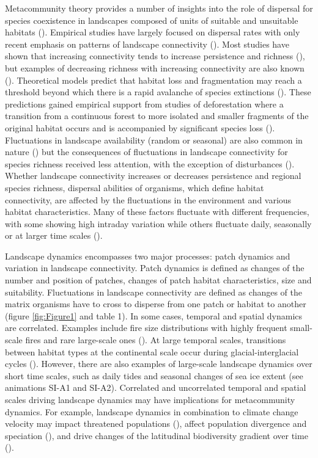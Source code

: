 \documentclass[12pt]{article}
\begin{document}
    Metacommunity theory provides a number of insights into the role of dispersal for species coexistence in landscapes composed of units of suitable and unsuitable habitats (\cite{Holyoaketal2005}). Empirical studies have largely focused on dispersal rates with only recent emphasis on patterns of landscape connectivity (\cite{kneitel2004, cadotte2006}). Most studies have shown that increasing connectivity tends to increase persistence and richness (\cite{ellneretal2001, foxetal2011}), but examples of decreasing richness with increasing connectivity are also known (\cite{daviesetal2009, altermattetal2011}). Theoretical models predict that habitat loss and fragmentation may reach a threshold beyond which there is a rapid avalanche of species extinctions (\cite{fahrig2002, ovaskainenhanski2003, rybickihanski2013}). These predictions gained empirical support from studies of deforestation where a transition from a continuous forest to more isolated and smaller fragments of the original habitat occurs and is accompanied by significant species loss (\cite{LauranceEtAl1997, MetzgerEtAl2009}). Fluctuations in landscape availability (random or seasonal) are also common in nature (\cite{Sprugel1991, RuizEtAl2014}) but the consequences of fluctuations in landscape connectivity for species richness received less attention, with the exception of disturbances (\cite{Sousa1984, SuppErnest2014}). Whether landscape connectivity increases or decreases persistence and regional species richness, dispersal abilities of organisms, which define habitat connectivity, are affected by the fluctuations in the environment and various habitat characteristics. Many of these factors fluctuate with different frequencies, with some showing high intraday variation while others fluctuate daily, seasonally or at larger time scales (\cite{StensethEtAl2002}). 
    
    Landscape dynamics encompasses two major processes: patch dynamics and variation in landscape connectivity. Patch dynamics is defined as changes of the number and position of patches, changes of patch habitat characteristics, size and suitability. Fluctuations in landscape connectivity are defined as changes of the matrix organisms have to cross to disperse from one patch or habitat to another (figure \ref{fig:Figure1} and table 1). In some cases, temporal and spatial dynamics are correlated. Examples include fire size distributions with highly frequent small-scale fires and rare large-scale ones (\cite{GEB:GEB12246}). At large temporal scales, transitions between habitat types at the continental scale occur during glacial-interglacial cycles (\cite{WerneckEtAl2011}). However, there are also examples of large-scale landscape dynamics over short time scales, such as daily tides and seasonal changes of sea ice extent (see animations SI-A1 and SI-A2). Correlated and uncorrelated temporal and spatial scales driving landscape dynamics may have implications for metacommunity dynamics. For example, landscape dynamics in combination to climate change velocity may impact threatened populations (\cite{loarieetal2009}), affect population divergence and speciation (\cite{aguileetal2011}), and drive changes of the latitudinal biodiversity gradient over time (\cite{mannionetal2014}).
    
\end{document}
